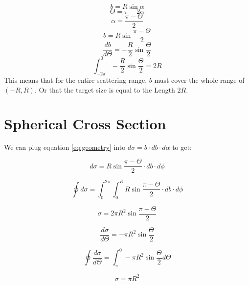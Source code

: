 \documentclass[12pt]{article}
\begin{document}
\begin{equation}
b=R{\sin{\alpha}}
\end{equation}
\begin{equation}
  \Theta=\pi-2\alpha
\end{equation}
\begin{equation}
  \alpha=\frac{\pi-\Theta}{2}
\end{equation}
\begin{equation}\label{eq:geometry}
  b=R\sin{\frac{\pi-\Theta}{2}}
\end{equation}
\begin{equation}
  \frac{{d}{b}}{{d}{\Theta}}=-\frac{R}{2}\sin{\frac{\Theta}{2}}
\end{equation}
\begin{equation}
  \int_{-2\pi}^{0}-\frac{R}{2}\sin{\frac{\Theta}{2}}=2R
\end{equation}
This means that for the entire scattering range, $b$ must cover the whole range of $(-R,R)$. Or that the target size is equal to the Length $2R$.

\pagebreak
\section{Spherical Cross Section}
We can plug equation \eqref{eq:geometry} into ${d}\sigma=b\cdot{d}b\cdot{d}\alpha$ to get:

\begin{equation}
  {d}\sigma=R\sin{\frac{\pi-\Theta}{2}}\cdot{d}b\cdot{d}\phi
\end{equation}

\begin{equation}
  \oint{d}\sigma=\int_0^{2\pi}\int_0^R R\sin{\frac{\pi-\Theta}{2}}\cdot{d}b\cdot{d}\phi
\end{equation}

\begin{equation}
  \sigma=2\pi R^2\sin{\frac{\pi-\Theta}{2}}
\end{equation}

\begin{equation}
  \frac{d\sigma}{d\Theta}=-\pi{R^2}\sin{\frac{\Theta}{2}}
\end{equation}

\begin{equation}
  \oint\frac{d\sigma}{d\Theta}=\int_\pi^0-\pi{R^2}\sin{\frac{\Theta}{2}}d\Theta
\end{equation}

\begin{equation}
  \sigma=\pi R^2
\end{equation}
\end{document}
